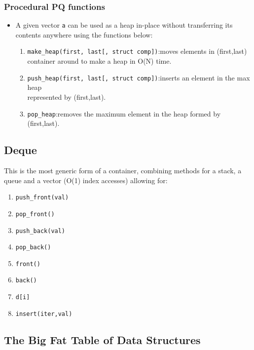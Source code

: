 \documentclass{report}
\begin{document}
\subsubsection{Procedural PQ functions}
\begin{itemize}
\item A given vector \texttt{a} can be used as a heap in-place without transferring its contents anywhere using the functions below:
\begin{enumerate}
\item \texttt{make\_heap(first, last[, struct comp])}:moves elements in (first,last) container around to make a heap in O(N) time.
\item \texttt{push\_heap(first, last[, struct comp])}:inserts an element in the max heap \\represented by (first,last).
\item \texttt{pop\_heap}:removes the maximum element in the heap formed by (first,last).
\end{enumerate}
\end{itemize}
\subsection{Deque}
This is the most generic form of a container, combining methods for a stack, a queue and a vector (O(1) index accesses) allowing for:
\begin{enumerate}
\item \texttt{push\_front(val)}
\item \texttt{pop\_front()}
\item \texttt{push\_back(val)}
\item \texttt{pop\_back()}
\item \texttt{front()}
\item \texttt{back()}
\item \texttt{d[i]}
\item \texttt{insert(iter,val)}
\end{enumerate}
\subsection{The Big Fat Table of Data Structures}

\end{document}
